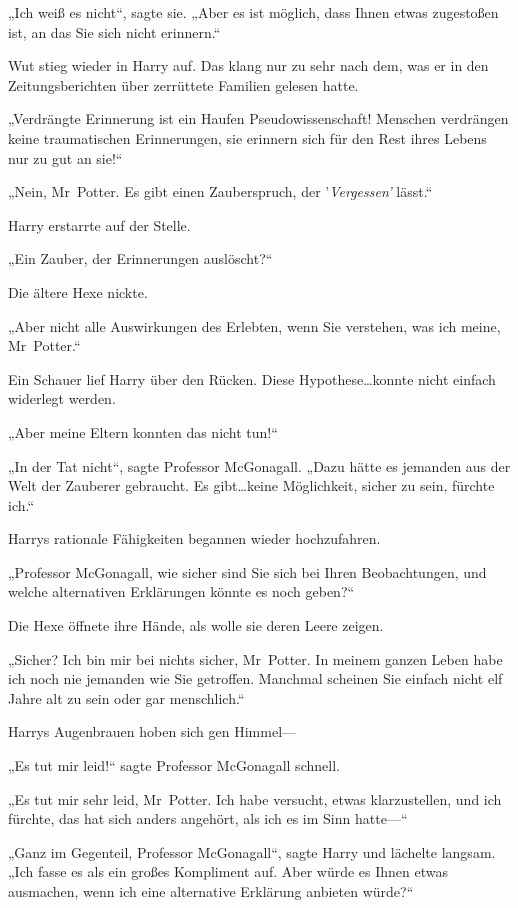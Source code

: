 {„Ich weiß es nicht“, sagte sie. „Aber es ist möglich, dass Ihnen etwas zugestoßen ist, an das Sie sich nicht erinnern.“

Wut stieg wieder in Harry auf. Das klang nur zu sehr nach dem, was er in den Zeitungsberichten über zerrüttete Familien gelesen hatte.

„Verdrängte Erinnerung ist ein Haufen Pseudowissenschaft! Menschen verdrängen keine traumatischen Erinnerungen, sie erinnern sich für den Rest ihres Lebens nur zu gut an sie!“

„Nein, Mr~Potter. Es gibt einen Zauberspruch, der '\emph{Vergessen'} lässt.“

Harry erstarrte auf der Stelle.

„Ein Zauber, der Erinnerungen auslöscht?“

Die ältere Hexe nickte.

„Aber nicht alle Auswirkungen des Erlebten, wenn Sie verstehen, was ich meine, Mr~Potter.“

Ein Schauer lief Harry über den Rücken. Diese Hypothese…konnte nicht einfach widerlegt werden.

„Aber meine Eltern konnten das nicht tun!“

„In der Tat nicht“, sagte Professor McGonagall. „Dazu hätte es jemanden aus der Welt der Zauberer gebraucht. Es gibt…keine Möglichkeit, sicher zu sein, fürchte ich.“

Harrys rationale Fähigkeiten begannen wieder hochzufahren.

„Professor McGonagall, wie sicher sind Sie sich bei Ihren Beobachtungen, und welche alternativen Erklärungen könnte es noch geben?“

Die Hexe öffnete ihre Hände, als wolle sie deren Leere zeigen.

„Sicher? Ich bin mir bei nichts sicher, Mr~Potter. In meinem ganzen Leben habe ich noch nie jemanden wie Sie getroffen. Manchmal scheinen Sie einfach nicht elf Jahre alt zu sein oder gar menschlich.“

Harrys Augenbrauen hoben sich gen Himmel—

„Es tut mir leid!“ sagte Professor McGonagall schnell.

„Es tut mir sehr leid, Mr~Potter. Ich habe versucht, etwas klarzustellen, und ich fürchte, das hat sich anders angehört, als ich es im Sinn hatte—“

„Ganz im Gegenteil, Professor McGonagall“, sagte Harry und lächelte langsam. „Ich fasse es als ein großes Kompliment auf. Aber würde es Ihnen etwas ausmachen, wenn ich eine alternative Erklärung anbieten würde?“

}
